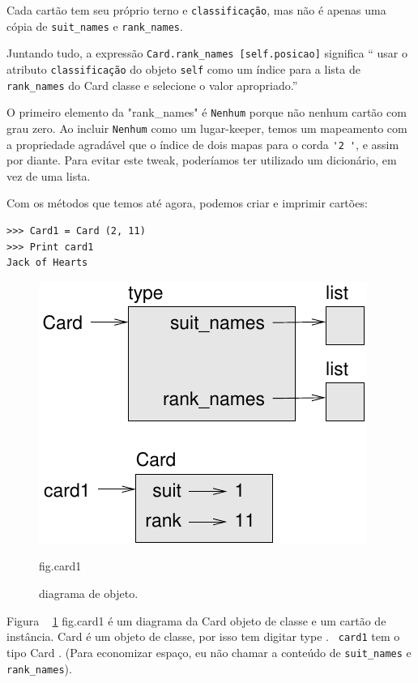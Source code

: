 \documentclass[10pt]{book}
\begin{document}
\begin{v erbatim}
{Cada cartão tem seu próprio terno {\tt} e {\tt classificação}, mas não
é apenas uma cópia de \verb "suit_names" e \verb "rank_names".

Juntando tudo, a expressão
\verb "Card.rank_names [self.posicao]" significa `` usar o atributo {\tt classificação}
do objeto {\tt self} como um índice para a lista de \verb "rank_names"
do {Card \tt} classe e selecione o valor apropriado.''

O primeiro elemento da \verbo "rank_names" é {\tt Nenhum} porque não
nenhum cartão com grau zero. Ao incluir {\tt Nenhum} como um lugar-keeper,
temos um mapeamento com a propriedade agradável que o índice de dois mapas para o
corda \verb "'2 '", e assim por diante. Para evitar este tweak, poderíamos ter
utilizado um dicionário, em vez de uma lista.

Com os métodos que temos até agora, podemos criar e imprimir cartões:

\begin{verbatim}
>>> Card1 = Card (2, 11)
>>> Print card1
Jack of Hearts
\end{verbatim}

\begin{figure}
\centerline
{\includegraphics[scale = 0.8] {figs/card1.pdf}}
\caption{diagrama de objeto.}
\label{} fig.card1
\end{figure}

Figura ~ \ref {} fig.card1 é um diagrama da {Card \tt} objeto de classe
e um cartão de instância.
{Card \tt} é um objeto de classe, por isso tem digitar {type \tt}. {\tt
card1} tem o tipo {Card \tt}. (Para economizar espaço, eu não chamar a
conteúdo de \verb "suit_names" e \verb "rank_names").


}
\end{v erbatim}
\end{document}

